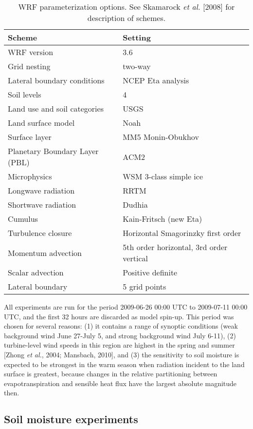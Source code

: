 \begin{table}
\begin{tabular}{l l}
\hline
Scheme & Setting \\ \hline
WRF version & 3.6 \\
Grid nesting & two-way \\
Lateral boundary conditions & NCEP Eta analysis \\
Soil levels & 4 \\
Land use and soil categories & USGS \\
Land surface model & Noah \\
Surface layer & MM5 Monin-Obukhov \\
Planetary Boundary Layer (PBL) & ACM2 \\
Microphysics & WSM 3-class simple ice \\
Longwave radiation & RRTM \\
Shortwave radiation & Dudhia \\
Cumulus & Kain-Fritsch (new Eta) \\
Turbulence closure & Horizontal Smagorinzky first order \\
Momentum advection & 5th order horizontal, 3rd order vertical \\
Scalar advection & Positive definite \\
Lateral boundary & 5 grid points \\
\hline
\end{tabular}
\caption{WRF parameterization options.  See Skamarock \textit{et al.} [2008] for description of schemes.}
\label{table:windSol_paramschemes}
\end{table}

All experiments are run for the period 2009-06-26 00:00 UTC to 2009-07-11 00:00 UTC, and the first 32 hours are discarded as model spin-up.  This period was chosen for several reasons: (1) it contains a range of synoptic conditions (weak background wind June 27-July 5, and strong background wind July 6-11), (2) turbine-level wind speeds in this region are highest in the spring and summer [Zhong \textit{et al.}, 2004; Mansbach, 2010], and (3) the sensitivity to soil moisture is expected to be strongest in the warm season when radiation incident to the land surface is greatest, because changes in the relative partitioning between evapotranspiration and sensible heat flux have the largest absolute magnitude then.

\subsection{Soil moisture experiments}


